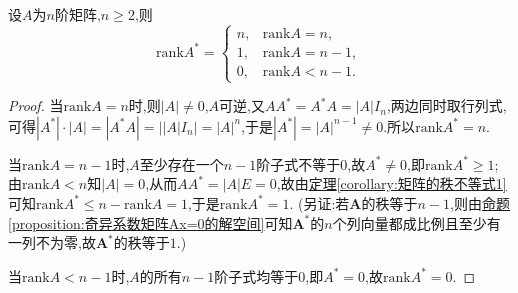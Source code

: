 \documentclass[../../main.tex]{subfiles}%
\begin{document}
\begin{theorem}[伴随矩阵的秩]\label{theorem:伴随矩阵的秩}
设\(A\)为\(n\)阶矩阵,\(n\geqslant  2\),则
\[
\mathrm{rank}A^* = 
\begin{cases}
n, & \mathrm{rank}A = n, \\
1, & \mathrm{rank}A = n - 1, \\
0, & \mathrm{rank}A < n - 1.
\end{cases}
\]
\end{theorem}
\begin{proof}
当\(\mathrm{rank}A = n\)时,则\(\vert A\vert\neq 0\),\(A\)可逆,又$AA^*=A^*A=\left| A \right|I_n$,两边同时取行列式,可得\(\left| A^* \right|\cdot \left| A \right|=\left| A^*A \right|=\left| \left| A \right|I_n \right|=\left| A \right|^n
\),于是$\left| A^* \right|=\left| A \right|^{n-1}\ne 0$.所以\(\mathrm{rank}A^* = n\).

当\(\mathrm{rank}A = n - 1\)时,\(A\)至少存在一个\(n - 1\)阶子式不等于\(0\),故\(A^*\neq 0\),即\(\mathrm{rank}A^*\geqslant  1\);由\(\mathrm{rank}A < n\)知\(\vert A\vert = 0\),从而\(AA^* = \vert A\vert E = 0\),故由\hyperref[corollary:矩阵的秩不等式1]{定理\ref{corollary:矩阵的秩不等式1}}可知\(\mathrm{rank}A^* \leqslant  n - \mathrm{rank}A = 1\),于是\(\mathrm{rank}A^* = 1\).
(另证:若\(\boldsymbol{A}\)的秩等于\(n - 1\),则由\hyperref[proposition:奇异系数矩阵Ax=0的解空间]{命题\ref{proposition:奇异系数矩阵Ax=0的解空间}}可知\(\boldsymbol{A}^*\)的\(n\)个列向量都成比例且至少有一列不为零,故\(\boldsymbol{A}^*\)的秩等于\(1\).)

当\(\mathrm{rank}A < n - 1\)时,\(A\)的所有\(n - 1\)阶子式均等于\(0\),即\(A^* = 0\),故\(\mathrm{rank}A^* = 0\).
\end{proof}
\end{document}
